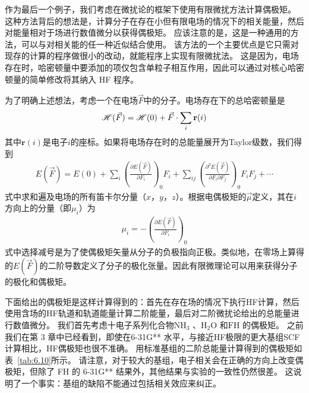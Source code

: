 作为最后一个例子，我们考虑在微扰论的框架下使用有限微扰方法计算偶极矩。 这种方法背后的想法是，计算分子在存在小但有限电场的情况下的相关能量，然后对能量相对于场进行数值微分以获得偶极矩。 应该注意的是，这是一种通用的方法，可以与对相关能的任一种近似结合使用。 该方法的一个主要优点是它只需对现存的计算的程序做很小的改动，就能程序上实现有限微扰法。 这是因为，电场存在时，哈密顿量中要添加的项仅包含单粒子相互作用，因此可以通过对核心哈密顿量的简单修改将其纳入 HF 程序。

为了明确上述想法，考虑一个在电场$\vec{F}$中的分子。电场存在下的总哈密顿量是
\begin{align}
	\mathscr{H}(\vec{F}) = \mathscr{H}(0) + \vec{F}\cdot \sum_i \mathbf{r}(i)
\end{align}
其中$\mathbf{r}(i)$是电子$i$的座标。如果将电场存在时的总能量展开为Taylor级数，我们得到
\begin{align}
	E(\vec{F}) = E(0) + \sum_i \left(\frac{\partial E(\vec{F})}{\partial F_i} \right)_0 F_i + \sum_{ij} \left(\frac{\partial^2 E(\vec{F})}{\partial F_i\partial F_j} \right)_0 F_iF_j + \cdots
\end{align}
式中求和遍及电场的所有笛卡尔分量（$x$，$y$，$z$）。根据电偶极矩的$\vec{\mu}$定义，其在$i$方向上的分量（即$\mu_i$）为
\begin{align}
	\mu_i = -\left(\frac{\partial E(\vec{F})}{\partial F_i}\right)_0
\end{align}
式中选择减号是为了使偶极矩矢量从分子的负极指向正极。类似地，在零场上算得的$E(\vec{F})$的二阶导数定义了分子的极化张量。因此有限微理论可以用来获得分子的极化和偶极矩。

下面给出的偶极矩是这样计算得到的：首先在存在场的情况下执行HF计算，然后使用含场的HF轨道和轨道能量计算二阶能量，最后对二阶微扰论给出的总能量进行数值微分。 我们首先考虑十电子系列化合物$\mathrm{NH_3}$ 、$\mathrm{H_2O}$ 和$\mathrm{FH}$ 的偶极矩。 之前我们在第 3 章中已经看到，即使在6-31G** 水平，与接近HF极限的更大基组SCF计算相比，HF偶极矩也很不准确。 用标准基组的二阶总能量计算得到的偶极矩如表~\ref{tab:6.10}所示。 请注意，对于较大的基组，电子相关会在正确的方向上改变偶极矩，但除了 FH 的 6-31G** 结果外，其他结果与实验的一致性仍然很差。 这说明了一个事实：基组的缺陷不能通过包括相关效应来纠正。

